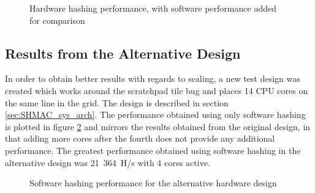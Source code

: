 \begin{figure}
	\centering
	\caption{Hardware hashing performance, with software performance added for comparison}
	\label{fig:shadmacomp-scaling1}
\end{figure}

\subsection{Results from the Alternative Design}
In order to obtain better results with regards to scaling, a new test design was created which works
around the scratchpad tile bug and places 14 CPU cores on the same line in the grid. The design
is described in section \ref{sec:SHMAC_sys_arch}. The performance obtained using only software hashing
is plotted in figure \ref{fig:sw-scaling2} and mirrors the results obtained from the original design,
in that adding more cores after the fourth does not provide any additional performance. The greatest
performance obtained using software hashing in the alternative design was 21~364~H/s with 4 cores
active.

\begin{figure}
	\centering
	\caption{Software hashing performance for the alternative hardware design}
	\label{fig:sw-scaling2}
\end{figure}

